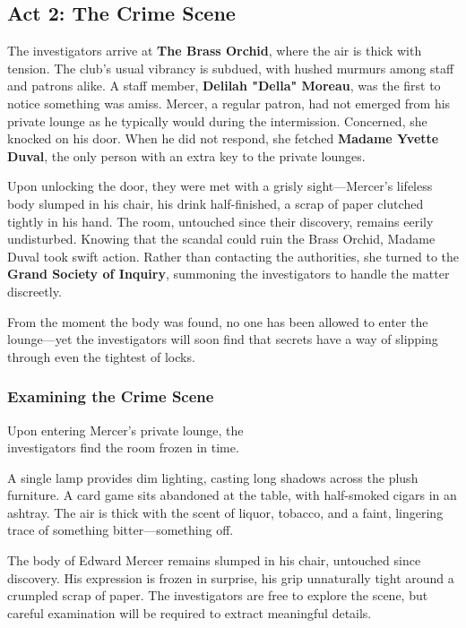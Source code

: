 \subsection{Act 2: The Crime Scene}


The investigators arrive at \textbf{The Brass Orchid}, where the air is thick with tension. The club’s usual vibrancy is subdued, with hushed murmurs among staff and patrons alike. A staff member, \textbf{Delilah "Della" Moreau}, was the first to notice something was amiss. Mercer, a regular patron, had not emerged from his private lounge as he typically would during the intermission. Concerned, she knocked on his door. When he did not respond, she fetched \textbf{Madame Yvette Duval}, the only person with an extra key to the private lounges. 

Upon unlocking the door, they were met with a grisly sight—Mercer’s lifeless body slumped in his chair, his drink half-finished, a scrap of paper clutched tightly in his hand. The room, untouched since their discovery, remains eerily undisturbed. Knowing that the scandal could ruin the Brass Orchid, Madame Duval took swift action. Rather than contacting the authorities, she turned to the \textbf{Grand Society of Inquiry}, summoning the investigators to handle the matter discreetly.

From the moment the body was found, no one has been allowed to enter the lounge—yet the investigators will soon find that secrets have a way of slipping through even the tightest of locks.


\subsubsection{Examining the Crime Scene}

Upon entering Mercer's private lounge, the\\ investigators find the room frozen in time. 

A single lamp provides dim lighting, casting long shadows across the plush furniture. A card game sits abandoned at the table, with half-smoked cigars in an ashtray. The air is thick with the scent of liquor, tobacco, and a faint, lingering trace of something bitter—something off.

The body of Edward Mercer remains slumped in his chair, untouched since discovery. His expression is frozen in surprise, his grip unnaturally tight around a crumpled scrap of paper. The investigators are free to explore the scene, but careful examination will be required to extract meaningful details.

